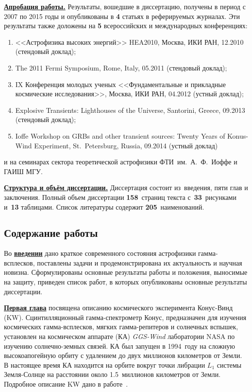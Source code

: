 \underline{\textbf{Апробация работы.}}
Результаты, вошедшие в диссертацию, получены в период с 2007 по 2015
годы и опубликованы в \textbf{4} статьях в реферируемых журналах.
Эти результаты также доложены на \textbf{5} всероссийских и международных конференциях: 
\begin{enumerate}
\item <<Астрофизика высоких энергий>> HEA2010, Москва, ИКИ РАН, 12.2010 (стендовый доклад);
\item The 2011 Fermi Symposium, Rome, Italy, 05.2011 (стендовый доклад);
\item IX Конференция молодых ученых <<Фундаментальные и прикладные космические исследования>>, 
    Москва, ИКИ РАН, 04.2012 (устный доклад);
\item Explosive Transients: Lighthouses of the Universe, Santorini, Greece, 09.2013 (стендовый доклад);
\item Ioffe Workshop on GRBs and other transient sources: Twenty Years of Konus-Wind Experiment, 
    St.~Petersburg, Russia, 09.2014 (устный доклад)
\end{enumerate}
и на семинарах сектора теоретической астрофизики ФТИ~им.~А.~Ф.~Иоффе и ГАИШ МГУ.




\underline{\textbf{Структура и объём диссертации.}} Диссертация состоит из~введения, 
пяти глав и заключения. Полный объем диссертации \textbf{158}~страниц текста 
с~\textbf{33}~рисунками и~\textbf{13} таблицами. Список литературы содержит \textbf{205}~наименований.

\subsection*{\Large Содержание работы}
Во \underline{\textbf{введении}} дано краткое современного состояния астрофизики гамма-всплесков,
поставлены задачи и продемонстрирована их актуальность и научная новизна.
Сформулированы основные результаты работы и положения, выносимые на защиту, приведен
список работ, в которых опубликованы основные результаты диссертации.

\underline{\textbf{Первая глава}} посвящена описанию космического эксперимента
Конус-Винд (KW). 
Сцинтилляционный гамма-спектрометр Конус, предназначен для изучения космических 
гамма-всплесков, мягких гамма-репитеров и солнечных вспышек,
установлен на космическом аппарате (КА) \textit{GGS-Wind} лаборатории NASA по изучению 
солнечно-земных связей. КА был запущен в 1994~году на сложную высокоапогейную орбиту 
с удалением до двух миллионов километров от Земли. В настоящее время КА находится 
на орбите вокруг точки либрации $L_1$ системы Земля-Солнце на расстоянии около 
1.5~миллионов километров от Земли.
Подробное описание KW дано в работе~\citep{Aptekar_1995SSR}.

